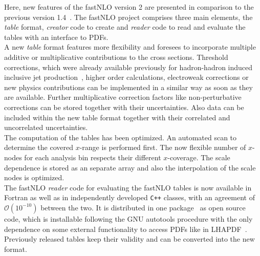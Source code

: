 \documentclass{DISproc}
\begin{document}
Here, new features of the fastNLO version 2 are presented in
comparison to the previous version 1.4~\cite{Kluge:2006xs}.
The fastNLO project comprises three main elements, the \emph{table}
format, \emph{creator} code to create and \emph{reader} code to read
and evaluate the tables with an interface to PDFs. \\
A new \emph{table} format features more flexibility and foresees to
incorporate multiple additive or multiplicative contributions to the
cross sections.  Threshold corrections, which were already available
previously for hadron-hadron induced inclusive jet
production~\cite{Kidonakis:2000gi}, higher order calculations,
electroweak corrections or new physics contributions can be
implemented in a similar way as soon as they are available.  Further
multiplicative correction factors like non-perturbative corrections
can be stored together with their uncertainties.
Also data can be included within the new table format together with
their correlated and uncorrelated uncertainties.\\
The computation of the tables has been optimized.  An automated scan
to determine the covered $x$-range is performed first.  The now
flexible number of $x$-nodes for each analysis bin respects their
different $x$-coverage.
The scale dependence is stored as an separate array and also the
interpolation of the scale nodes is optimized.\\
The fastNLO \emph{reader} code for evaluating the fastNLO tables is
now available in Fortran as well as in independently developed
\texttt{C++} classes, with an agreement of $\mathcal{O}(10^{-10})$
between the two.  It is distributed in one
package~\cite{Fnlo:2012:Online} as open source code, which is
installable following the GNU autotools procedure with the only
dependence on some external functionality to access PDFs like in
LHAPDF~\cite{Whalley:2005nh}.  Previously released tables keep their
validity and can be converted into the new format.



\end{document}
